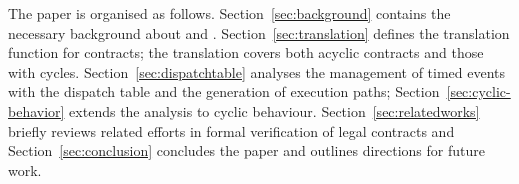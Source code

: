 The paper is organised as follows. Section~\ref{sec:background}
contains the necessary background about {\Stipula} and
{\KeY}. Section~\ref{sec:translation} defines the translation function
for {\Stipula} contracts; the translation covers both acyclic
contracts and those with cycles.  Section~\ref{sec:dispatchtable}
analyses the management of timed events with the dispatch table and
the generation of execution paths; Section~\ref{sec:cyclic-behavior}
extends the analysis to cyclic behaviour.
Section~\ref{sec:relatedworks} briefly reviews related efforts in
formal verification of legal contracts and
Section~\ref{sec:conclusion} concludes the paper and outlines
directions for future work.




